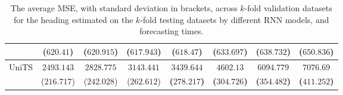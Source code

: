 \begin{table}[!ht]
{\begin{tabular}{|c|c|c|c|c|c|c|c|}
			 & ($620.41$) & ($620.915$) & ($617.943$) & ($618.47$) & ($633.697$) & ($638.732$) & ($650.836$) \\ \hline
			\multirow{2}{*}{UniTS} & $2493.143$ & $2828.775$ & $3143.441$ & $\mathbf{3439.644}$ & $\mathbf{4602.13}$ & $\mathbf{6094.779}$ & $\mathbf{7076.69}$ \\
			 & ($216.717$) & ($242.028$) & ($262.612$) & \textbf{(}$\mathbf{278.217}$\textbf{)} & \textbf{(}$\mathbf{304.726}$\textbf{)} & \textbf{(}$\mathbf{354.482}$\textbf{)} & \textbf{(}$\mathbf{411.252}$\textbf{)} \\ \hline
		\end{tabular}
	}
	\caption{The average MSE, with standard deviation in brackets, across $k$-fold validation datasets for the heading estimated on the $k$-fold testing datasets by different RNN models, and forecasting times.}
	\label{tab:all_direction_MSE}
\end{table}

